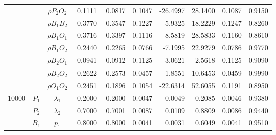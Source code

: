 \documentclass[letterpaper]{article}
\begin{document}
\begin{table}[h]
\begin{tabular}{cccrrrrrrr}
            &             & $\rho{P_2O_2}$ & 0.1111                 & 0.0817                 & 0.1047                 & -26.4997               & 28.1400                & 0.1087                   & 0.9150                 \\
            &             & $\rho{B_1B_2}$ & 0.3770                 & 0.3547                 & 0.1227                 & -5.9325                & 18.2229                & 0.1247                   & 0.8260                 \\
            &             & $\rho{B_1O_1}$ & -0.3716                & -0.3397                & 0.1116                 & -8.5819                & 28.5833                & 0.1160                   & 0.8610                 \\
            &             & $\rho{B_1O_2}$ & 0.2440                 & 0.2265                 & 0.0766                 & -7.1995                & 22.9279                & 0.0786                   & 0.9770                 \\
            &             & $\rho{B_2O_1}$ & -0.0941                & -0.0912                & 0.1125                 & -3.0621                & 2.5618                 & 0.1125                   & 0.9090                 \\
            &             & $\rho{B_2O_2}$ & 0.2622                 & 0.2573                 & 0.0457                 & -1.8551                & 10.6453                & 0.0459                   & 0.9990                 \\
            &             & $\rho{O_1O_2}$ & 0.2451                 & 0.1896                 & 0.1054                 & -22.6314               & 52.6055                & 0.1191                   & 0.8950                 \\\hline
10000       & $P_1$       & $\lambda_1$    & 0.2000                 & 0.2000                 & 0.0047                 & 0.0049                 & 0.2085                 & 0.0046                   & 0.9380                 \\
            & $P_2$       & $\lambda_2$    & 0.7000                 & 0.7001                 & 0.0087                 & 0.0109                 & 0.8809                 & 0.0086                   & 0.9440                 \\
            & $B_1$       & $p_1$          & 0.8000                 & 0.8000                 & 0.0041                 & 0.0031                 & 0.6049                 & 0.0041                   & 0.9510                 \\

\end{tabular}
\end{table}
\end{document}
